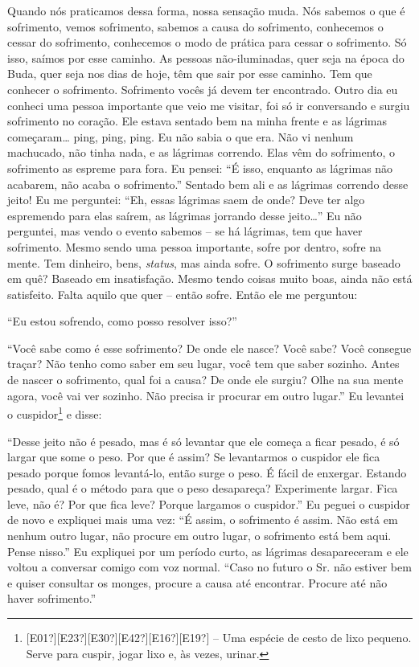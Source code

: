 Quando nós praticamos dessa forma, nossa sensação muda. Nós sabemos
o que é sofrimento, vemos sofrimento, sabemos a causa do sofrimento,
conhecemos o cessar do sofrimento, conhecemos o modo de prática para
cessar o sofrimento. Só isso, saímos por esse caminho. As pessoas
não-iluminadas, quer seja na época do Buda, quer seja nos dias de hoje,
têm que sair por esse caminho. Tem que conhecer o sofrimento.
Sofrimento vocês já devem ter encontrado. Outro dia eu conheci uma
pessoa importante que veio me visitar, foi só ir conversando e surgiu
sofrimento no coração. Ele estava sentado bem na minha frente e as
lágrimas começaram… ping, ping, ping. Eu não sabia o que era. Não vi
nenhum machucado, não tinha nada, e as lágrimas correndo. Elas vêm do
sofrimento, o sofrimento as espreme para fora. Eu pensei: “É isso,
enquanto as lágrimas não acabarem, não acaba o sofrimento.” Sentado bem
ali e as lágrimas correndo desse jeito! Eu me perguntei: “Eh, essas
lágrimas saem de onde? Deve ter algo espremendo para elas saírem, as
lágrimas jorrando desse jeito…” Eu não perguntei, mas vendo o evento
sabemos – se há lágrimas, tem que haver sofrimento.
Mesmo sendo uma pessoa importante, sofre por dentro, sofre na mente.
Tem dinheiro, bens, \textit{status}, mas ainda sofre. O sofrimento
surge baseado em quê? Baseado em insatisfação. Mesmo tendo coisas muito
boas, ainda não está satisfeito. Falta aquilo que quer
– então sofre. Então ele me perguntou: 

“Eu estou sofrendo, como posso resolver isso?” 

“Você sabe como é esse sofrimento? De onde ele nasce? Você sabe?
Você consegue traçar? Não tenho como saber em seu lugar, você tem que
saber sozinho. Antes de nascer o sofrimento, qual foi a causa? De onde
ele surgiu? Olhe na sua mente agora, você vai ver sozinho. Não precisa
ir procurar em outro lugar.” Eu levantei o
cuspidor\footnote{[E01?][E23?][E30?][E42?][E16?][E19?] – Uma espécie de
cesto de lixo pequeno. Serve para cuspir, jogar lixo e, às vezes,
urinar.} e disse: 

“Desse jeito não é pesado, mas é só levantar que ele começa a ficar
pesado, é só largar que some o peso. Por que é assim? Se levantarmos o
cuspidor ele fica pesado porque fomos levantá-lo, então surge o peso. É
fácil de enxergar. Estando pesado, qual é o método para que o peso
desapareça? Experimente largar. Fica leve, não é? Por que fica leve?
Porque largamos o cuspidor.” Eu peguei o cuspidor de novo e expliquei
mais uma vez: “É assim, o sofrimento é assim. Não está em nenhum outro
lugar, não procure em outro lugar, o sofrimento está bem aqui. Pense
nisso.” Eu expliquei por um período curto, as lágrimas desapareceram e
ele voltou a conversar comigo com voz normal. “Caso no futuro o Sr. não
estiver bem e quiser consultar os monges, procure a causa até
encontrar. Procure até não haver sofrimento.”

